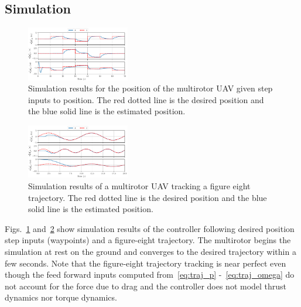 
\subsection{Simulation}

\begin{figure}
  \centering
  \includegraphics[width=0.4\textwidth]{figures/sim_wps_position}
  \caption{Simulation results for the position of the multirotor UAV given step
  inputs to position. The red dotted line is the desired position and the blue
solid line is the estimated position.}
  \label{f:sim_wps}
\end{figure}

\begin{figure}
  \centering
  \includegraphics[width=0.4\textwidth]{figures/sim_fig8_position}
  \caption{Simulation results of a multirotor UAV tracking a figure eight
  trajectory. The red dotted line is the desired position and the blue solid
line is the estimated position.}
  \label{f:sim_fig8}
\end{figure}

Figs.~\ref{f:sim_wps} and~\ref{f:sim_fig8} show simulation results of the
controller following desired position step inputs (waypoints) and a figure-eight trajectory. The
multirotor begins the simulation at rest on the ground and converges to the
desired trajectory within a few seconds. Note that the figure-eight trajectory
tracking is near perfect even though the feed forward inputs computed
from~\eqref{eq:traj_p} -~\eqref{eq:traj_omega} do not account for the force due to drag and
the controller does not model thrust dynamics nor torque dynamics.

